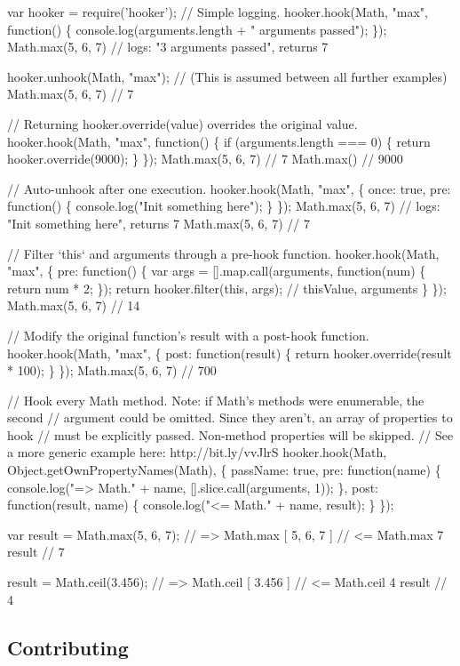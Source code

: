 \begin{DoxyCode}
var hooker = require('hooker');
// Simple logging.
hooker.hook(Math, "max", function() \{
  console.log(arguments.length + " arguments passed");
\});
Math.max(5, 6, 7) // logs: "3 arguments passed", returns 7

hooker.unhook(Math, "max"); // (This is assumed between all further examples)
Math.max(5, 6, 7) // 7

// Returning hooker.override(value) overrides the original value.
hooker.hook(Math, "max", function() \{
  if (arguments.length === 0) \{
    return hooker.override(9000);
  \}
\});
Math.max(5, 6, 7) // 7
Math.max() // 9000

// Auto-unhook after one execution.
hooker.hook(Math, "max", \{
  once: true,
  pre: function() \{
    console.log("Init something here");
  \}
\});
Math.max(5, 6, 7) // logs: "Init something here", returns 7
Math.max(5, 6, 7) // 7

// Filter `this` and arguments through a pre-hook function.
hooker.hook(Math, "max", \{
  pre: function() \{
    var args = [].map.call(arguments, function(num) \{
      return num * 2;
    \});
    return hooker.filter(this, args); // thisValue, arguments
  \}
\});
Math.max(5, 6, 7) // 14

// Modify the original function's result with a post-hook function.
hooker.hook(Math, "max", \{
  post: function(result) \{
    return hooker.override(result * 100);
  \}
\});
Math.max(5, 6, 7) // 700

// Hook every Math method. Note: if Math's methods were enumerable, the second
// argument could be omitted. Since they aren't, an array of properties to hook
// must be explicitly passed. Non-method properties will be skipped.
// See a more generic example here: http://bit.ly/vvJlrS
hooker.hook(Math, Object.getOwnPropertyNames(Math), \{
  passName: true,
  pre: function(name) \{
    console.log("=> Math." + name, [].slice.call(arguments, 1));
  \},
  post: function(result, name) \{
    console.log("<= Math." + name, result);
  \}
\});

var result = Math.max(5, 6, 7);
// => Math.max [ 5, 6, 7 ]
// <= Math.max 7
result // 7

result = Math.ceil(3.456);
// => Math.ceil [ 3.456 ]
// <= Math.ceil 4
result // 4
\end{DoxyCode}


\subsection*{Contributing}

